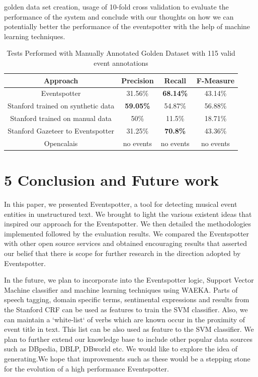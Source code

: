 \documentclass[a4paper,11pt]{report}
\begin{document}
\begin{table}[ht]
golden data set creation, usage of 10-fold cross validation to evaluate the performance of the system and conclude with our thoughts on how we can potentially better the performance of the eventspotter with the help of machine learning techniques.
\caption{Tests Performed with Manually Annotated Golden Dataset with 115 valid event annotations} %
\centering %
\begin{tabular}{c c c c} %
\hline\hline %
Approach & Precision & Recall & F-Measure \\ [0.5ex] %
\hline %
Eventspotter & 31.56\% & \bf 68.14\% \bf & 43.14\% \\
Stanford trained on synthetic data & \bf 59.05\% \bf & 54.87\% & 56.88\%\\
Stanford trained on manual data & 50\% & 11.5\% & 18.71\% \\
Stanford Gazeteer to Eventspotter & 31.25\% & \bf 70.8\% \bf & 43.36\% \\
Opencalais & no events & no events & no events \\
\hline %
\end{tabular}
\label{table:nonlin} %
\end{table}

\chapter*{5 Conclusion and Future work}

In this paper, we presented Eventspotter, a tool for detecting musical event entities in unstructured text. We brought to light the various existent ideas that inspired our approach for the Eventspotter. We then detailed the methodologies implemented followed by the evaluation results. We compared the Eventspotter with other open source services and obtained encouraging results that asserted our belief that there is scope for further research in the direction adopted by Eventspotter.

In the future, we plan to incorporate into the Eventspotter logic, Support Vector Machine classifier and machine learning techniques using WAEKA. Parts of speech tagging, domain specific terms, sentimental expressions and results from the Stanford CRF can be used as features to train the SVM classifier. Also, we can maintain a `white-list` of verbs which are known occur in the proximity of event title in text. This list can be also used as feature to the SVM classifier. We plan to further extend our knowledge base to include other popular data sources such as DBpedia, DBLP, DBworld etc. We would like to explore the idea of generating.We hope that improvements such as these would be a stepping stone for the evolution of a high performance Eventspotter.
{}
\end{document}
